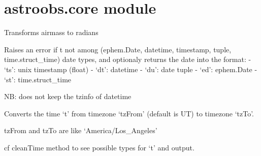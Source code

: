 \documentclass[letterpaper,10pt,english]{sphinxmanual}
\begin{document}
\begin{fulllineitems}
\label{astroobs:astroobs.astroobsexception.raiseIt}
\end{fulllineitems}



\section{astroobs.core module}
\label{astroobs:astroobs-core-module}\label{astroobs:module-astroobs.core}

\begin{fulllineitems}
\label{astroobs:astroobs.core.airmass_to_rad}
Transforms airmass to radians

\end{fulllineitems}


\begin{fulllineitems}
\label{astroobs:astroobs.core.cleanTime}
Raises an error if t not among (ephem.Date, datetime, timestamp, tuple, time.struct\_time) date types, and optionaly returns the date into the format:
- `ts': unix timestamp (float)
- `dt': datetime
- `du': date tuple
- `ed': ephem.Date
- `st': time.struct\_time

NB: does not keep the tzinfo of datetime

\end{fulllineitems}


\begin{fulllineitems}
\label{astroobs:astroobs.core.convertTime}
Converts the time `t' from timezone `tzFrom' (default is UT) to timezone `tzTo'.

tzFrom and tzTo are like `America/Los\_Angeles'

cf cleanTime method to see possible types for `t' and output.

\end{fulllineitems}
\end{document}
